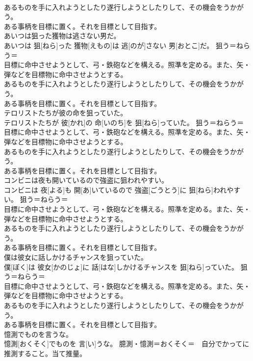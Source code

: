 \documentclass[8pt]{extreport}
\begin{document}
\begin{CJK}{UTF8}{min}
{\\	あるものを手に入れようとしたり遂行しようとしたりして、その機会をうかがう。 
\\	ある事柄を目標に置く。それを目標として目指す。
\\	あいつは狙った獲物は逃さない男だ。	
\\	あいつは 狙[ねら]った 獲物[えもの]は 逃[のが]さない 男[おとこ]だ。	狙う＝ねらう＝ 
\\	目標に命中させようとして、弓・鉄砲などを構える。照準を定める。また、矢・弾などを目標物に命中させようとする。 
\\	あるものを手に入れようとしたり遂行しようとしたりして、その機会をうかがう。 
\\	ある事柄を目標に置く。それを目標として目指す。
\\	テロリストたちが彼の命を狙っていた。	
\\	テロリストたちが 彼[かれ]の 命[いのち]を 狙[ねら]っていた。	狙う＝ねらう＝ 
\\	目標に命中させようとして、弓・鉄砲などを構える。照準を定める。また、矢・弾などを目標物に命中させようとする。 
\\	あるものを手に入れようとしたり遂行しようとしたりして、その機会をうかがう。 
\\	ある事柄を目標に置く。それを目標として目指す。
\\	コンビニは夜も開いているので強盗に狙われやすい。	
\\	コンビニは 夜[よる]も 開[あ]いているので 強盗[ごうとう]に 狙[ねら]われやすい。	狙う＝ねらう＝ 
\\	目標に命中させようとして、弓・鉄砲などを構える。照準を定める。また、矢・弾などを目標物に命中させようとする。 
\\	あるものを手に入れようとしたり遂行しようとしたりして、その機会をうかがう。 
\\	ある事柄を目標に置く。それを目標として目指す。
\\	僕は彼女に話しかけるチャンスを狙っていた。	
\\	僕[ぼく]は 彼女[かのじょ]に 話[はな]しかけるチャンスを 狙[ねら]っていた。	狙う＝ねらう＝ 
\\	目標に命中させようとして、弓・鉄砲などを構える。照準を定める。また、矢・弾などを目標物に命中させようとする。 
\\	あるものを手に入れようとしたり遂行しようとしたりして、その機会をうかがう。 
\\	ある事柄を目標に置く。それを目標として目指す。
\\	憶測でものを言うな。	
\\	憶測[おくそく]でものを 言[い]うな。	臆測・憶測＝おくそく＝　自分でかってに推測すること。当て推量。
}
\end{CJK}
\end{document}
